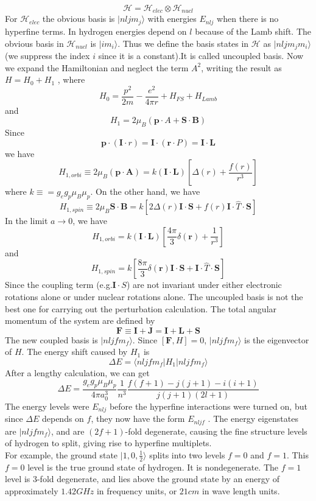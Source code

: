 \[\mathcal{H} = \mathcal{H}_{elec} \otimes \mathcal{H}_{nucl}\]
For $\mathcal{H}_{elec}$ the obvious basis is $|nljm_j\rangle$ with energies $E_{nlj}$ when there is no hyperfine terms. In hydrogen energies depend on $l$ because of the Lamb shift. The obvious basis in $\mathcal{H}_{nucl}$ is $|im_i\rangle$. Thus we define the basis states in $\mathcal{H}$ as $|nljm_jm_i\rangle$ (we suppress the index $i$ since it is a constant).It is called uncoupled basis. Now we expand the Hamiltonian and neglect the term $A^2$, writing the result as $H = H_0 + H_1$ , where
\[H_0 = \frac{p^2}{2m} - \frac{e^2}{4\pi r}  + H_{FS} + H_{Lamb}\]
and
\[H_1 = 2\mu_B(\bm{p}\cdot{A} + \bm{S}\cdot\bm{B})\]
Since
\[\bm{p}\cdot(\bm{I}\cdot{r}) = \bm{I}\cdot(\bm{r}\cdot{P}) = \bm{I}\cdot\bm{L}\]
we have
\[H_{1,orbi} \equiv 2\mu_B(\bm{p}\cdot\bm{A}) = k(\bm{I}\cdot\bm{L}) \left[\Delta(r) + \frac{f(r)}{r^3}\right ]\]
where $k \equiv = g_eg_p\mu_B\mu_p$.
On the other hand, we have
\[H_{1,spin} \equiv 2\mu_B \bm{S}\cdot\bm{B} = k\left [2\Delta(r)\bm{I}\cdot\bm{S} + f(r)\bm{I}\cdot\hat{T}\cdot\bm{S}\right ] \]
In the limit $a \to 0$, we have
\[H_{1,orbi} = k(\bm{I}\cdot\bm{L}) \left[\frac{4\pi}{3}\delta(\bm{r}) + \frac{1}{r^3}\right ]\]
and
\[H_{1,spin}  = k\left [\frac{8\pi}{3}\delta(\bm{r})\bm{I}\cdot\bm{S} + \bm{I}\cdot\hat{T}\cdot\bm{S}\right ] \]
Since the coupling term (e.g.$\bm{I}\cdot{S}$) are not invariant under either electronic rotations alone or under nuclear rotations alone. The uncoupled basis is not the best one for carrying out the perturbation calculation. The total angular momentum of the system are defined by
\[\bm{F} \equiv \bm{I} + \bm{J} = \bm{I} + \bm{L} + \bm{S}\]
The new coupled basis is $|nljfm_f\rangle$. Since $[\bm{F},H] = 0$, $|nljfm_f\rangle$ is the eigenvector of $H$. The energy shift caused by $H_1$ is
\[\Delta E = \langle nljfm_f | H_1 | nljfm_f\rangle\]
After a lengthy calculation, we can get
\[\Delta E = \frac{g_eg_p\mu_B\mu_p}{4\pi a_0^3} \frac{1}{n^3} \frac{f(f+1)-j(j+1)-i(i+1)}{j(j+1)(2l+1)} \]
The energy levels were $E_{nlj}$ before the hyperfine interactions were turned on, but since $\Delta E$ depends on $f$, they now have the form $E_{nljf}$ . The energy eigenstates are $|nljfm_f\rangle$, and are $(2f+1)$-fold degenerate, causing the fine structure levels of hydrogen to split, giving rise to hyperfine multiplets. \\
For example, the ground state $|1,0,\frac{1}{2}\rangle$ splits into two levels $f = 0$ and $f = 1$. This $f = 0$ level is the true ground state of hydrogen. It is nondegenerate. The $f=1$ level is 3-fold degenerate, and lies above the ground state by an energy of approximately $1.42 GHz$ in frequency
units, or $21 cm$ in wave length units.

